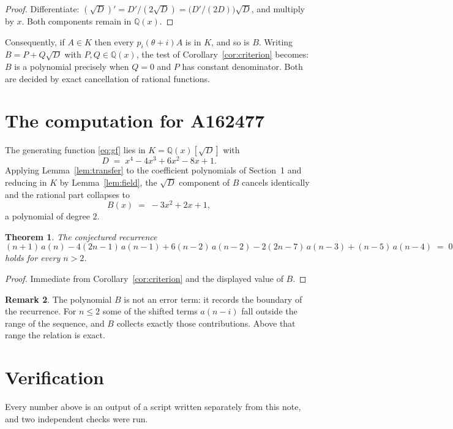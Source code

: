 \documentclass[11pt,a4paper]{article}
\theoremstyle{plain}
\newtheorem{theorem}{Theorem}
\theoremstyle{definition}
\newtheorem{remark}[theorem]{Remark}
\begin{document}
\begin{proof}
Differentiate: $(\sqrt{D})'=D'/(2\sqrt{D})=\bigl(D'/(2D)\bigr)\sqrt{D}$, and multiply by
$x$. Both components remain in $\mathbb{Q}(x)$.
\end{proof}

Consequently, if $A\in K$ then every $p_{i}(\theta+i)A$ is in $K$, and so is $B$. Writing
$B=P+Q\sqrt{D}$ with $P,Q\in\mathbb{Q}(x)$, the test of Corollary~\ref{cor:criterion}
becomes: $B$ is a polynomial precisely when $Q=0$ and $P$ has constant denominator. Both
are decided by exact cancellation of rational functions.

\section{The computation for A162477}

The generating function \eqref{eq:gf} lies in $K=\mathbb{Q}(x)[\sqrt{D}]$ with
\[
D \;=\; x^{4} - 4 x^{3} + 6 x^{2} - 8 x + 1 .
\]
Applying Lemma~\ref{lem:transfer} to the coefficient polynomials of Section~1 and reducing
in $K$ by Lemma~\ref{lem:field}, the $\sqrt{D}$ component of $B$ cancels identically and
the rational part collapses to
\[
B(x)\;=\;- 3 x^{2} + 2 x + 1 ,
\]
a polynomial of degree $2$.

\begin{theorem}
The conjectured recurrence
\[
(n + 1)\,a(n) -  4 \left(2 n - 1\right)\,a(n-1) + 6 \left(n - 2\right)\,a(n-2) -  2 \left(2 n - 7\right)\,a(n-3) + (n - 5)\,a(n-4) \;=\;0
\]
holds for every $n>2$.
\end{theorem}

\begin{proof}
Immediate from Corollary~\ref{cor:criterion} and the displayed value of $B$.
\end{proof}

\begin{remark}
The polynomial $B$ is not an error term: it records the boundary of the recurrence. For
$n\le2$ some of the shifted terms $a(n-i)$ fall outside the range of the sequence,
and $B$ collects exactly those contributions. Above that range the relation is exact.
\end{remark}

\section{Verification}

Every number above is an output of a script written separately from this note, and two
independent checks were run.
\end{document}
